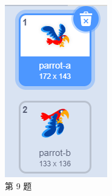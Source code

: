 \documentclass[10pt, a4paper]{article}
\begin{document}
\begin{enumerate}
\begin{figure}[htbp]
\begin{minipage}[t]{.12\textwidth}
                \includegraphics[width=\textwidth]{9.png}
                \caption*{第 9 题}
            \end{minipage}
            \begin{minipage}[t]{.3\textwidth}
                \centering

\end{minipage}
\end{figure}
\end{enumerate}
\end{document}
